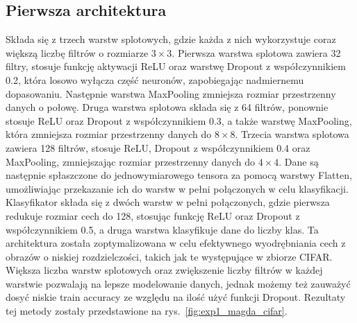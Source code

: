 \documentclass[10pt]{article}
\begin{document}
\subsection*{Pierwsza architektura}
Składa się z trzech warstw splotowych, gdzie każda z nich wykorzystuje coraz większą liczbę filtrów o rozmiarze $3 \times 3$.
Pierwsza warstwa splotowa zawiera 32 filtry, stosuje funkcję aktywacji ReLU oraz warstwę Dropout z współczynnikiem 0.2, która losowo wyłącza część neuronów, zapobiegając nadmiernemu dopasowaniu.
Następnie warstwa MaxPooling zmniejsza rozmiar przestrzenny danych o połowę.
Druga warstwa splotowa składa się z 64 filtrów, ponownie stosuje ReLU oraz Dropout z współczynnikiem 0.3, a także warstwę MaxPooling, która zmniejsza rozmiar przestrzenny danych do $8 \times 8$.
Trzecia warstwa splotowa zawiera 128 filtrów, stosuje ReLU, Dropout z współczynnikiem 0.4 oraz MaxPooling, zmniejszając rozmiar przestrzenny danych do $4 \times 4$.
Dane są następnie spłaszczone do jednowymiarowego tensora za pomocą warstwy Flatten, umożliwiając przekazanie ich do warstw w pełni połączonych w celu klasyfikacji.
Klasyfikator składa się z dwóch warstw w pełni połączonych, gdzie pierwsza redukuje rozmiar cech do 128, stosując funkcję ReLU oraz Dropout z współczynnikiem 0.5, a druga warstwa klasyfikuje dane do liczby klas.
Ta architektura została zoptymalizowana w celu efektywnego wyodrębniania cech z obrazów o niskiej rozdzielczości, takich jak te występujące w zbiorze CIFAR\@.
Większa liczba warstw splotowych oraz zwiększenie liczby filtrów w każdej warstwie pozwalają na lepsze modelowanie danych, jednak możemy też zauważyć dosyć niskie train accuracy ze względu na ilość użyć funkcji Dropout.
Rezultaty tej metody zostały przedstawione na rys.~\ref{fig:exp1_magda_cifar}.

\MagdaCifarLarge{}
\end{document}
